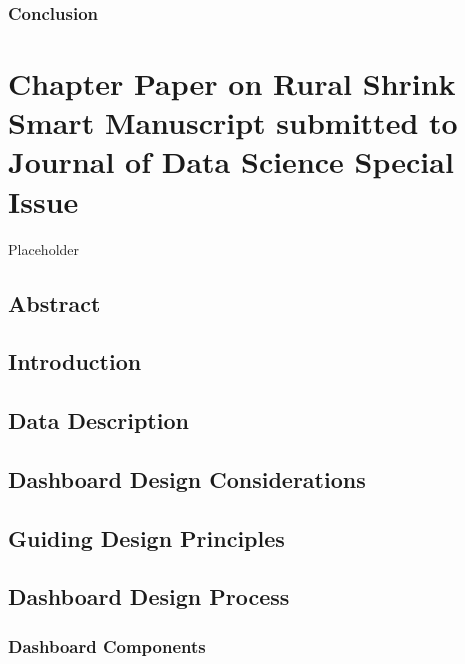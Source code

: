 \documentclass[print]{nuthesis}
\begin{document}
\hypertarget{conclusion}{%
\subsection{Conclusion}\label{conclusion}}

\hypertarget{rmd-basics}{%
\chapter{Chapter Paper on Rural Shrink Smart Manuscript submitted to Journal of Data Science Special Issue}\label{rmd-basics}}

Placeholder

\hypertarget{abstract}{%
\section{Abstract}\label{abstract}}

\hypertarget{introduction-1}{%
\section{Introduction}\label{introduction-1}}

\hypertarget{data-description}{%
\section{Data Description}\label{data-description}}

\hypertarget{dashboard-design-considerations}{%
\section{Dashboard Design Considerations}\label{dashboard-design-considerations}}

\hypertarget{guiding-design-principles}{%
\section{Guiding Design Principles}\label{guiding-design-principles}}

\hypertarget{dashboard-design-process}{%
\section{Dashboard Design Process}\label{dashboard-design-process}}

\hypertarget{dashboard-components}{%
\subsection{Dashboard Components}\label{dashboard-components}}
\end{document}
